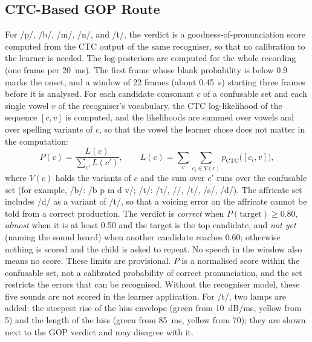 \documentclass[conference]{IEEEtran}
\newcommand{\ipa}[1]{/#1/}
\begin{document}
\subsection{CTC-Based GOP Route}\label{sec:gop}
For \ipa{p}, \ipa{b}, \ipa{m}, \ipa{n}, and \ipa{t\textesh}, the verdict is a goodness-of-pronunciation score computed from the CTC output of the same recogniser, so that no calibration to the learner is needed. The log-posteriors are computed for the whole recording (one frame per 20~ms). The first frame whose blank probability is below 0.9 marks the onset, and a window of 22 frames (about 0.45~s) starting three frames before it is analysed. For each candidate consonant $c$ of a confusable set and each single vowel $v$ of the recogniser's vocabulary, the CTC log-likelihood of the sequence $[c,v]$ is computed, and the likelihoods are summed over vowels and over spelling variants of $c$, so that the vowel the learner chose does not matter in the computation:
\begin{equation}
P(c)=\frac{L(c)}{\sum_{c'} L(c')},\qquad L(c)=\sum_{v}\sum_{c_i\in V(c)} p_{\mathrm{CTC}}\bigl([c_i,v]\bigr),
\end{equation}
where $V(c)$ holds the variants of $c$ and the sum over $c'$ runs over the confusable set (for example, \ipa{b}: \ipa{b p m d v}; \ipa{t\textesh}: \ipa{t\textesh}, \ipa{\textesh}, \ipa{t}, \ipa{s}, \ipa{d}). The affricate set includes \ipa{d\textyogh} as a variant of \ipa{t\textesh}, so that a voicing error on the affricate cannot be told from a correct production. The verdict is \textit{correct} when $P(\text{target})\geq0.80$, \textit{almost} when it is at least 0.50 and the target is the top candidate, and \textit{not yet} (naming the sound heard) when another candidate reaches 0.60; otherwise nothing is scored and the child is asked to repeat. No speech in the window also means no score. These limits are provisional. $P$ is a normalised score within the confusable set, not a calibrated probability of correct pronunciation, and the set restricts the errors that can be recognised. Without the recogniser model, these five sounds are not scored in the learner application. For \ipa{t\textesh}, two lamps are added: the steepest rise of the hiss envelope (green from 10~dB/ms, yellow from 5) and the length of the hiss (green from 85~ms, yellow from 70); they are shown next to the GOP verdict and may disagree with it.
\end{document}
